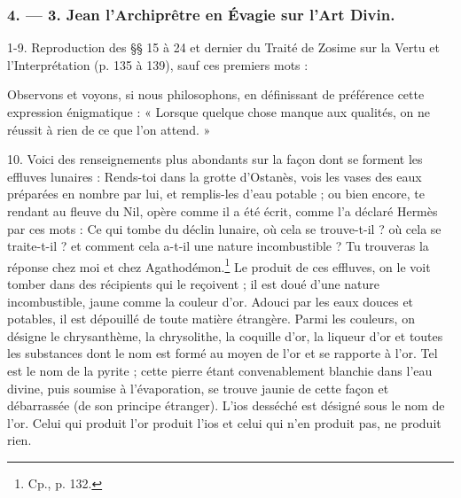 \documentclass[a4paper, 11pt, oneside, polutonikogreek, french]{article}
\begin{document}
\bigskip
\centerline{\EightStarTaper}
\centerline{\EightStarTaper\EightStarTaper}
\bigskip

\subsubsection{4. --- 3. Jean l'Archiprêtre en Évagie sur l'Art Divin.}

1-9. Reproduction des §§ 15 à 24 et dernier du Traité de Zosime sur la Vertu et l'Interprétation (p. 135 à 139), sauf ces premiers mots :

Observons et voyons, si nous philosophons, en définissant de préférence cette expression énigmatique : « Lorsque quelque chose manque aux qualités, on ne réussit à rien de ce que l'on attend. »

10. Voici des renseignements plus abondants sur la façon dont se forment les effluves lunaires : Rends-toi dans la grotte d'Ostanès, vois les vases des eaux préparées en nombre par lui, et remplis-les d'eau potable ; ou bien encore, te rendant au fleuve du Nil, opère comme il a été écrit, comme l'a déclaré Hermès par ces mots : Ce qui tombe du déclin lunaire, où cela se trouve-t-il ? où cela se traite-t-il ? et comment cela a-t-il une nature incombustible ? Tu trouveras la réponse chez moi et chez Agathodémon.\footnote{Cp., p. 132.} Le produit de ces effluves, on le voit tomber dans des récipients qui le reçoivent ; il est doué d'une nature incombustible, jaune comme la couleur d'or. Adouci par les eaux douces et potables, il est dépouillé de toute matière étrangère. Parmi les couleurs, on désigne le chrysanthème, la chrysolithe, la coquille d'or, la liqueur d'or et toutes les substances dont le nom est formé au moyen de l'or et se rapporte à l'or. Tel est le nom de la pyrite ; cette pierre étant convenablement blanchie dans l'eau divine, puis soumise à l'évaporation, se trouve jaunie de cette façon et débarrassée (de son principe étranger). L'ios desséché est désigné sous le nom de l'or. Celui qui produit l'or produit l'ios et celui qui n'en produit pas, ne produit rien.
\end{document}
